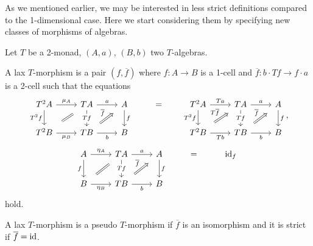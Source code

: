 \documentclass[a4paper,11pt,oneside,openany]{scrbook}
\begin{document}
As we mentioned earlier, we may be interested in less strict definitions
compared to the 1-dimensional case. Here we start considering them by specifying
new classes of morphisms of algebras.

\begin{defn}
    Let $T$ be a 2-monad, $(A,a)$, $(B,b)$ two $T$-algebras.

    A lax $T$-morphism is a pair $(f,\overline{f})$ where $f\colon A\rightarrow
    B$ is a 1-cell and $\overline{f}\colon b\cdot Tf\rightarrow f\cdot a$ is a
    2-cell such that the equations
    \[\begin{tikzcd}
        {T^2A} & TA & A & {=} & {T^2A} & TA & A \\
        {T^2B} & TB & B && {T^2B} & TB & B
        \arrow["a", from=1-2, to=1-3]
        \arrow["f", from=1-3, to=2-3]
        \arrow["b"', from=2-2, to=2-3]
        \arrow["Tf"{description}, from=1-2, to=2-2]
        \arrow["{T^2f}"', from=1-1, to=2-1]
        \arrow["{\mu_B}"', from=2-1, to=2-2]
        \arrow["{\mu_A}", from=1-1, to=1-2]
        \arrow["{\overline{f}}", shorten <=6pt, shorten >=6pt, Rightarrow, from=2-2, to=1-3]
        \arrow[shorten <=8pt, shorten >=8pt, Rightarrow, no head, from=2-1, to=1-2]
        \arrow["b"', from=2-6, to=2-7]
        \arrow["f", from=1-7, to=2-7]
        \arrow["Tf"{description}, from=1-6, to=2-6]
        \arrow["Tb"', from=2-5, to=2-6]
        \arrow["a", from=1-6, to=1-7]
        \arrow["{T^2f}"', from=1-5, to=2-5]
        \arrow["Ta", from=1-5, to=1-6]
        \arrow["{\overline{f}}", shorten <=6pt, shorten >=6pt, Rightarrow, from=2-6, to=1-7]
        \arrow["{T\overline{f}}", shorten <=6pt, shorten >=6pt, Rightarrow, from=2-5, to=1-6]
    \end{tikzcd},\]
    \[\begin{tikzcd}
        A & TA & A & {=} & {\id_f} \\
        B & TB & B
        \arrow["f", from=1-3, to=2-3]
        \arrow["Tf"{description}, from=1-2, to=2-2]
        \arrow["f"', from=1-1, to=2-1]
        \arrow["{\eta_B}"', from=2-1, to=2-2]
        \arrow["b"', from=2-2, to=2-3]
        \arrow["a", from=1-2, to=1-3]
        \arrow["{\eta_A}", from=1-1, to=1-2]
        \arrow["{\overline{f}}", shorten <=6pt, shorten >=6pt, Rightarrow, from=2-2, to=1-3]
        \arrow[shorten <=8pt, shorten >=8pt, Rightarrow, no head, from=2-1, to=1-2]
    \end{tikzcd}\]
    hold.

    A lax $T$-morphism is a pseudo $T$-morphism if $\overline{f}$ is an
    isomorphism and it is strict if $\overline{f}=\operatorname{id}$.


\end{defn}
\end{document}
